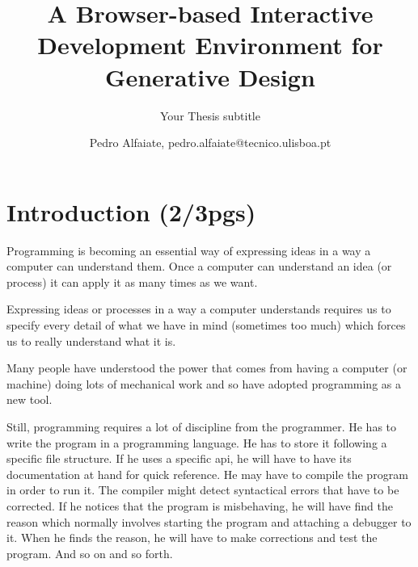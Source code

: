 \documentclass{./llncs2e/llncs}
\begin{document}
\title{A Browser-based Interactive Development Environment for Generative Design}

\subtitle{Your Thesis subtitle}
\author{Pedro Alfaiate, pedro.alfaiate@tecnico.ulisboa.pt}

\maketitle

\begin{abstract}

\end{abstract}
\begin{keywords}

\end{keywords}
\section{Introduction (2/3pgs)}
	Programming is becoming an essential way of expressing ideas in a way a computer can understand them.
	Once a computer can understand an idea (or process) it can apply it as many times as we want.

	Expressing ideas or processes in a way a computer understands requires us to specify every detail of what we have in mind (sometimes too much) which forces us to really understand what it is.

	Many people have understood the power that comes from having a computer (or machine) doing lots of mechanical work and so have adopted programming as a new tool.

	Still, programming requires a lot of discipline from the programmer.
	He has to write the program in a programming language.
	He has to store it following a specific file structure.
	If he uses a specific \ac{api}, he will have to have its documentation at hand for quick reference.
	He may have to compile the program in order to run it.
	The compiler might detect syntactical errors that have to be corrected.
	If he notices that the program is misbehaving, he will have find the reason which normally involves starting the program and attaching a debugger to it.
	When he finds the reason, he will have to make corrections and test the program.
	And so on and so forth.
\end{document}
